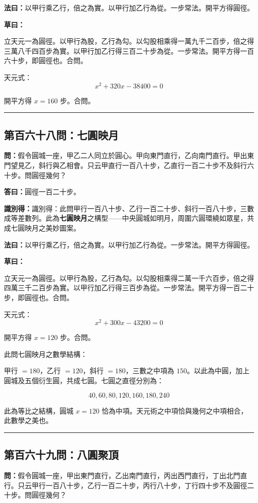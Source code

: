 \documentclass[11pt,a4paper]{article}
\newcommand{\longline}{\noindent\rule{\textwidth}{0.4pt}}
\newcommand{\wen}[1]{\par\noindent\textbf{\textcolor{probcolor}{問：}}{#1}\par}
\newcommand{\da}[1]{\par\noindent\textbf{\textcolor{anscolor}{答曰：}}{#1}\par}
\newcommand{\fayue}[1]{\par\noindent\textbf{\textcolor{methodcolor}{法曰：}}{#1}\par}
\newcommand{\caoyue}[1]{\par\noindent\textbf{草曰：}{#1}\par}
\newcommand{\zhi}[1]{\par\noindent\textbf{識別得：}{#1}\par}
\begin{document}
\fayue{以甲行乘乙行，倍之為實。以甲行加乙行為從。一步常法。開平方得圓徑。}

\caoyue{
立天元一為圓徑。以甲行為股，乙行為勾。以勾股相乘得一萬九千二百步，倍之得三萬八千四百步為實。以甲行加乙行得三百二十步為從。一步常法。開平方得一百六十步，即圓徑也。合問。

天元式：
$$x^2 + 320x - 38400 = 0$$

開平方得 $x = 160$ 步。合問。
}

\vspace{0.5cm}
\longline

\subsection*{第百六十八問：七圓映月}
\wen{假令圓城一座，甲乙二人同立於圓心。甲向東門直行，乙向南門直行。甲出東門望見乙，斜行與乙相會。只云甲直行一百八十步，乙直行一百二十步不及斜行六十步。問圓徑幾何？}

\da{圓徑一百二十步。}

\zhi{識別得：此問甲行一百八十步、乙行一百二十步、斜行一百八十步，三數成等差數列。此為\textbf{七圓映月}之構型——中央圓城如明月，周圍六圓環繞如眾星，共成七圓映月之美妙圖案。}

\fayue{以甲行乘乙行，倍之為實。以甲行加乙行為從。一步常法。開平方得圓徑。}

\caoyue{
立天元一為圓徑。以甲行為股，乙行為勾。以勾股相乘得二萬一千六百步，倍之得四萬三千二百步為實。以甲行加乙行得三百步為從。一步常法。開平方得一百二十步，即圓徑也。合問。

天元式：
$$x^2 + 300x - 43200 = 0$$

開平方得 $x = 120$ 步。合問。

此問七圓映月之數學結構：

甲行 $= 180$，乙行 $= 120$，斜行 $= 180$，三數之中項為 $150$。以此為中圓，加上圓城及五個衍生圓，共成七圓。七圓之直徑分別為：

$$40, 60, 80, 120, 160, 180, 240$$

此為等比之結構，圓城 $x = 120$ 恰為中項。天元術之中項恰與幾何之中項相合，此數學之美也。
}

\vspace{0.5cm}
\longline

\subsection*{第百六十九問：八圓聚頂}
\wen{假令圓城一座，甲出東門直行，乙出南門直行，丙出西門直行，丁出北門直行。只云甲行一百八十步，乙行一百二十步，丙行八十步，丁行四十步不及圓徑二十步。問圓徑幾何？}
\end{document}
